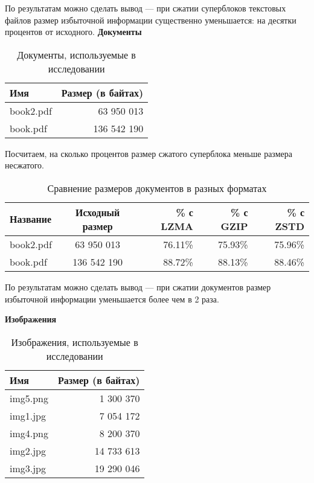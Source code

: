 По результатам можно сделать вывод --- при сжатии суперблоков текстовых файлов размер избыточной информации существенно уменьшается: на десятки процентов от исходного.  
\newpage
\textbf{Документы}

\begin{table}[h]
\centering
\caption{Документы, используемые в исследовании}
\begin{tabular}{|l|r|}
\hline
Имя & Размер (в байтах) \\
\hline
book2.pdf & 63 950 013 \\
\hline
book.pdf & 136 542 190 \\
\hline
\end{tabular}
\end{table}



Посчитаем, на сколько процентов размер сжатого суперблока меньше размера несжатого.  
\begin{table}[h]
\centering
\caption{Сравнение размеров документов в разных форматах}
\begin{tabular}{|l|c|r|r|r|}
\hline
Название & Исходный размер & \% с LZMA & \% с GZIP & \% с ZSTD \\
\hline
book2.pdf & 63 950 013 & 76.11\% & 75.93\% & 75.96\% \\
\hline
book.pdf & 136 542 190 & 88.72\% & 88.13\% & 88.46\% \\
\hline
\end{tabular}
\end{table}


По результатам можно сделать вывод --- при сжатии документов размер избыточной информации уменьшается более чем в 2 раза.
   
\textbf{Изображения}

\begin{table}[h]
\centering
\caption{Изображения, используемые в исследовании}
\begin{tabular}{|l|r|}
\hline
Имя & Размер (в байтах) \\
\hline
img5.png & 1 300 370 \\
\hline
img1.jpg & 7 054 172 \\
\hline
img4.png & 8 200 370 \\
\hline
img2.jpg & 14 733 613 \\
\hline
img3.jpg & 19 290 046 \\
\hline
\end{tabular}
\end{table}

